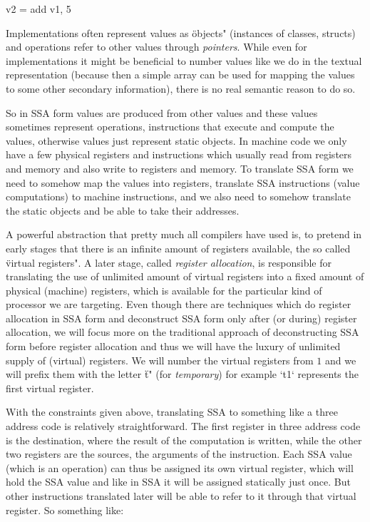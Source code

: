 \begtt
v2 = add v1, 5
\endtt

Implementations often represent values as \"objects" (instances of classes,
structs) and operations refer to other values through {\em pointers}. While even
for implementations it might be beneficial to number values like we do in the
textual representation (because then a simple array can be used for mapping the
values to some other secondary information), there is no real semantic reason to
do so.

So in SSA form values are produced from other values and these values sometimes
represent operations, instructions that execute and compute the values,
otherwise values just represent static objects. In machine code we only have
a few physical registers and instructions which usually read from registers and
memory and also write to registers and memory. To translate SSA form we need to
somehow map the values into registers, translate SSA instructions (value
computations) to machine instructions, and we also need to somehow translate the
static objects and be able to take their addresses.

A powerful abstraction that pretty much all compilers have used is, to pretend
in early stages that there is an infinite amount of registers available, the so
called \"virtual registers". A later stage, called {\em register
allocation}, is responsible for translating the use of unlimited amount of
virtual registers into a fixed amount of physical (machine) registers, which is
available for the particular kind of processor we are targeting. Even though
there are techniques which do register allocation in SSA form and deconstruct
SSA form only after (or during) register allocation, we will focus more on the
traditional approach of deconstructing SSA form before register allocation and
thus we will have the luxury of unlimited supply of (virtual) registers. We will
number the virtual registers from $1$ and we will prefix them with the letter
\"t" (for {\em temporary}) for
example `t1` represents the first virtual register.

With the constraints given above, translating SSA to something like a three
address code is relatively straightforward. The first register in three address
code is the destination, where the result of the computation is written, while
the other two registers are the sources, the arguments of the instruction. Each
SSA value (which is an operation) can thus be assigned its own virtual register,
which will hold the SSA value and like in SSA it will be assigned statically
just once. But other instructions translated later will be able to refer to
it through that virtual register. So something like:

